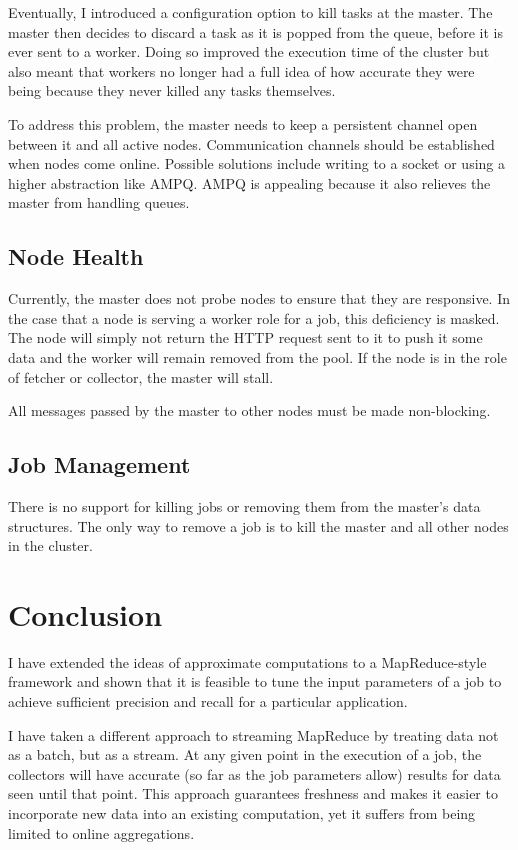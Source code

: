 \documentclass[12pt,twocolumn]{article}
\begin{document}
Eventually, I introduced a configuration option to kill tasks at the master. The master then
decides to discard a task as it is popped from the queue, before it is ever sent to a worker.
Doing so improved the execution time of the cluster but also meant that workers no longer
had
a full idea of how accurate they were being because they never killed any tasks themselves.

To address this problem, the master needs to keep a persistent channel open between
it and all active nodes. Communication channels should be established when nodes come
online.
Possible solutions include writing to a socket or using a higher abstraction like AMPQ\@.
AMPQ is appealing because it also relieves the master from handling queues.

\subsection{Node Health}
Currently, the master does not probe nodes to ensure that they are responsive. In the case
that
a node is serving a worker role for a job, this deficiency is masked. The node will simply not
return the HTTP request sent to it to push it some data and the worker will remain removed
from
the pool. If the node is in the role of fetcher or collector, the master will stall.

All messages passed by the master to other nodes must be made non-blocking.

\subsection{Job Management}
There is no support for killing jobs or removing them from the master's data structures. The
only
way to remove a job is to kill the master and all other nodes in the cluster.

\section{Conclusion}
I have extended the ideas of approximate computations to a MapReduce-style framework
and shown
that it is feasible to tune the input parameters of a job to achieve sufficient precision and
recall for a particular application.

I have taken a different approach to streaming MapReduce by treating data not as a batch,
but
as a stream. At any given point in the execution of a job, the collectors will have accurate
(so far as the job parameters allow) results for data seen until that point. This approach
guarantees freshness and makes it easier to incorporate new data into an existing
computation,
yet it suffers from being limited to online aggregations.
\end{document}
